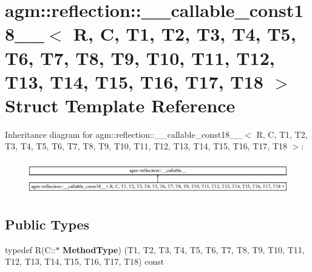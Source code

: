 \hypertarget{structagm_1_1reflection_1_1____callable__const18____}{}\section{agm\+:\+:reflection\+:\+:\+\_\+\+\_\+callable\+\_\+const18\+\_\+\+\_\+$<$ R, C, T1, T2, T3, T4, T5, T6, T7, T8, T9, T10, T11, T12, T13, T14, T15, T16, T17, T18 $>$ Struct Template Reference}
\label{structagm_1_1reflection_1_1____callable__const18____}
Inheritance diagram for agm\+:\+:reflection\+:\+:\+\_\+\+\_\+callable\+\_\+const18\+\_\+\+\_\+$<$ R, C, T1, T2, T3, T4, T5, T6, T7, T8, T9, T10, T11, T12, T13, T14, T15, T16, T17, T18 $>$\+:\begin{figure}[H]
\begin{center}
\leavevmode
\includegraphics[height=1.477572cm]{structagm_1_1reflection_1_1____callable__const18____}
\end{center}
\end{figure}
\subsection*{Public Types}
\begin{DoxyCompactItemize}
\item 
typedef R(C\+::$\ast$ {\bfseries Method\+Type}) (T1, T2, T3, T4, T5, T6, T7, T8, T9, T10, T11, T12, T13, T14, T15, T16, T17, T18) const \hypertarget{structagm_1_1reflection_1_1____callable__const18_____aa8d10398b955a1c6e116e0311b48d0ce}{}\label{structagm_1_1reflection_1_1____callable__const18_____aa8d10398b955a1c6e116e0311b48d0ce}

\end{DoxyCompactItemize}
